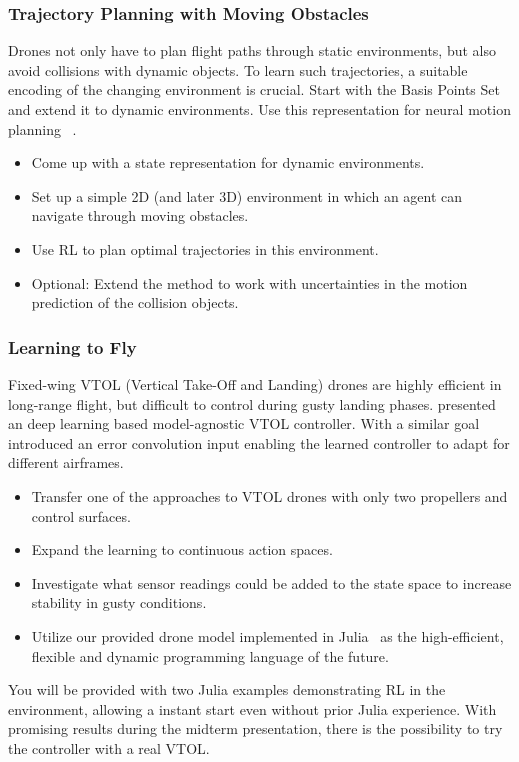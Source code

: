 \documentclass[a4paper]{article}
\begin{document}


\subsubsection{Trajectory Planning with Moving Obstacles}
Drones not only have to plan flight paths through static environments, but also avoid collisions with dynamic objects.
To learn such trajectories, a suitable encoding of the changing environment is crucial.
Start with the Basis Points Set ~\citet{Prokudin2019} and extend it to dynamic environments.
Use this representation for neural motion planning ~\citet{Qureshi2019}.

\begin{itemize}
  \item Come up with a state representation for dynamic environments.
  \item Set up a simple 2D (and later 3D) environment in which an agent can navigate through moving obstacles.
  \item Use RL to plan optimal trajectories in this environment.
  \item Optional: Extend the method to work with uncertainties in the motion prediction of the collision objects.
\end{itemize}

\subsubsection{Learning to Fly}
Fixed-wing VTOL (Vertical Take-Off and Landing) drones are highly efficient in long-range flight, but difficult to control during gusty landing phases.
\citet{ModelAgnosticVTOL} presented an deep learning based model-agnostic VTOL controller. With a similar goal \citet{LearningToFly} introduced an error convolution input enabling the learned controller to adapt for different airframes.
\begin{itemize}
  \item Transfer one of the approaches to VTOL drones with only two propellers and control surfaces.
  \item Expand the learning to continuous action spaces.
  \item Investigate what sensor readings could be added to the state space to increase stability in gusty conditions.
  \item Utilize our provided drone model implemented in Julia~\cite{WebJulia} as the high-efficient, flexible and dynamic programming language of the future.
\end{itemize}
You will be provided with two Julia examples demonstrating RL in the environment, allowing a instant start even without prior Julia experience.
With promising results during the midterm presentation, there is the possibility to try the controller with a real VTOL. %
\end{document}
